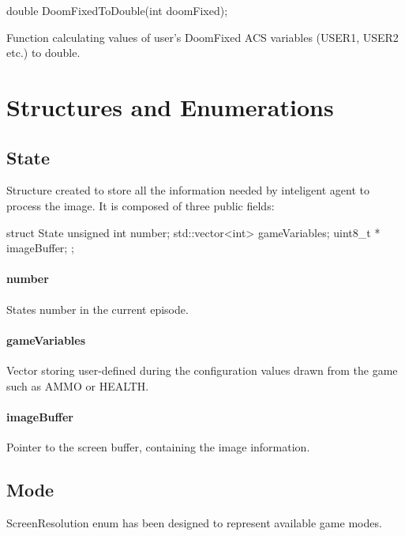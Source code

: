 \vspace{20pt}
\begin{clinee}
double DoomFixedToDouble(int doomFixed);
\end{clinee}

Function calculating values of user's DoomFixed ACS variables (USER1, USER2 etc.) to double.


\vspace{20pt}
\section{Structures and Enumerations} \label{sec:structs}
\subsection{State}


Structure created to store all the information needed by inteligent agent to process the image.  
It is composed of three public fields:

\vspace{20pt}	
\begin{clinee}
	struct State {
	    unsigned int number; 
	    std::vector<int> gameVariables;
	    uint8_t * imageBuffer;
	};
\end{clinee}
\paragraph{number} States number in the current episode.
\paragraph{gameVariables} Vector storing user-defined during the configuration values drawn from the game such as AMMO or HEALTH. 
\paragraph{imageBuffer} Pointer to the screen buffer, containing the image information.

\subsection{Mode}\label{subsec:mode}
ScreenResolution enum has been designed to represent available game modes.


